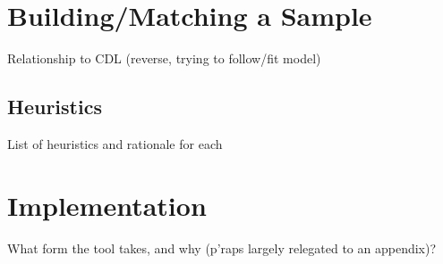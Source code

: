 % 
% 
% 
% 
% 


\section{Building/Matching a Sample}
Relationship to CDL (reverse, trying to follow/fit model)

\subsection{Heuristics}
List of heuristics and rationale for each

\section{Implementation}
What form the tool takes, and why (p'raps largely relegated to an appendix)?


